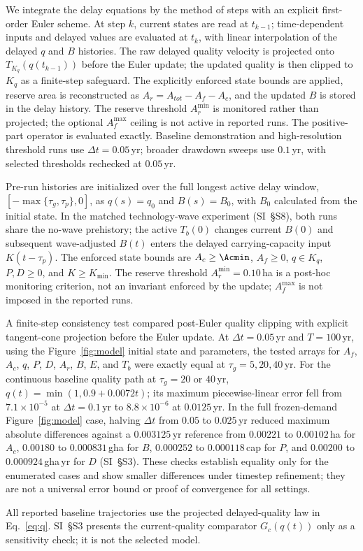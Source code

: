 We integrate the delay equations by the method of steps with an explicit first-order Euler scheme. At step $k$, current states are read at $t_{k-1}$; time-dependent inputs and delayed values are evaluated at $t_k$, with linear interpolation of the delayed $q$ and $B$ histories. The raw delayed quality velocity is projected onto $T_{K_q}(q(t_{k-1}))$ before the Euler update; the updated quality is then clipped to $K_q$ as a finite-step safeguard. The explicitly enforced state bounds are applied, reserve area is reconstructed as $A_r=A_{tot}-A_f-A_c$, and the updated $B$ is stored in the delay history. The reserve threshold $A_r^{\min}$ is monitored rather than projected; the optional $A_f^{\max}$ ceiling is not active in reported runs. The positive-part operator is evaluated exactly. Baseline demonstration and high-resolution threshold runs use $\Delta t=0.05$\,yr; broader drawdown sweeps use $0.1$\,yr, with selected thresholds rechecked at $0.05$\,yr.

Pre-run histories are initialized over the full longest active delay window, $[-\max\{\tau_g,\tau_p\},0]$, as $q(s)=q_0$ and $B(s)=B_0$, with $B_0$ calculated from the initial state. In the matched technology-wave experiment (SI~\S S8), both runs share the no-wave prehistory; the active $T_b(0)$ changes current $B(0)$ and subsequent wave-adjusted $B(t)$ enters the delayed carrying-capacity input $K(t-\tau_p)$. The enforced state bounds are $A_c\ge\Acmin$, $A_f\ge0$, $q\in K_q$, $P,D\ge0$, and $K\ge K_{\min}$. The reserve threshold $A_r^{\min}=0.10$\,ha is a post-hoc monitoring criterion, not an invariant enforced by the update; $A_f^{\max}$ is not imposed in the reported runs.

A finite-step consistency test compared post-Euler quality clipping with explicit tangent-cone projection before the Euler update. At $\Delta t=0.05$\,yr and $T=100$\,yr, using the Figure~\ref{fig:model} initial state and parameters, the tested arrays for $A_f$, $A_c$, $q$, $P$, $D$, $A_r$, $B$, $E$, and $T_b$ were exactly equal at $\tau_g=5,20,40$\,yr. For the continuous baseline quality path at $\tau_g=20$ or $40$\,yr, $q(t)=\min(1,0.9+0.0072t)$; its maximum piecewise-linear error fell from $7.1\times10^{-5}$ at $\Delta t=0.1$\,yr to $8.8\times10^{-6}$ at $0.0125$\,yr. In the full frozen-demand Figure~\ref{fig:model} case, halving $\Delta t$ from $0.05$ to $0.025$\,yr reduced maximum absolute differences against a $0.003125$\,yr reference from $0.00221$ to $0.00102$\,ha for $A_c$, $0.00180$ to $0.000831$\,gha for $B$, $0.000252$ to $0.000118$\,cap for $P$, and $0.00200$ to $0.000924$\,gha\,yr for $D$ (SI~\S S3). These checks establish equality only for the enumerated cases and show smaller differences under timestep refinement; they are not a universal error bound or proof of convergence for all settings.

All reported baseline trajectories use the projected delayed-quality law in Eq.~\eqref{eq:q}. SI~\S S3 presents the current-quality comparator $G_c(q(t))$ only as a sensitivity check; it is not the selected model.
